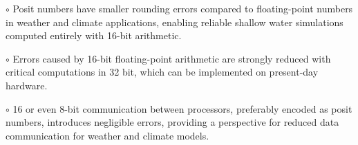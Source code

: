\documentclass[draft]{agujournal2019}
\begin{document}





\begin{keypoints}
\item $\circ$ Posit numbers have smaller rounding errors compared to floating-point
 numbers in weather and climate applications, enabling reliable shallow water
 simulations computed entirely with 16-bit arithmetic.

\item $\circ$ Errors caused by 16-bit floating-point arithmetic are strongly
reduced with critical computations in 32 bit, which can be implemented on
present-day hardware.

\item $\circ$ 16 or even 8-bit communication between processors, preferably
encoded as posit numbers, introduces negligible errors, providing a perspective
for reduced data communication for weather and climate models.

\end{keypoints}

%
%

%
%
\end{document}
